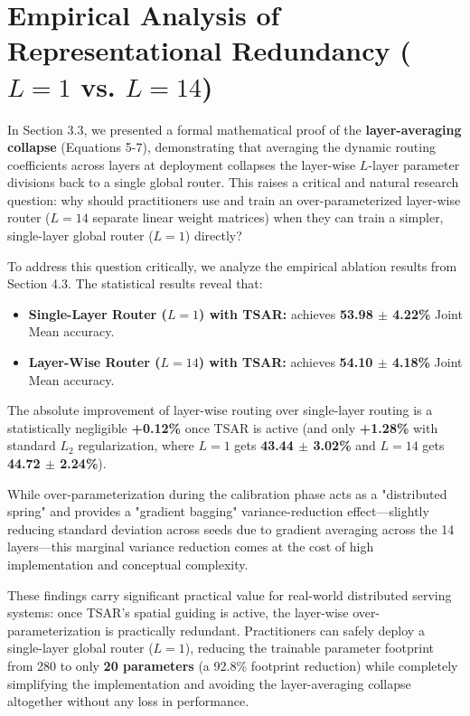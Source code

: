 \section{Empirical Analysis of Representational Redundancy ($L=1$ vs. $L=14$)}
\label{sec:redundancy_analysis}

In Section 3.3, we presented a formal mathematical proof of the \textbf{layer-averaging collapse}
(Equations 5-7), demonstrating that averaging the dynamic routing coefficients across layers at
deployment collapses the layer-wise $L$-layer parameter divisions back to a single global router.
This raises a critical and natural research question: why should practitioners use and train an
over-parameterized layer-wise router ($L=14$ separate linear weight matrices) when they can train a
simpler, single-layer global router ($L=1$) directly?

To address this question critically, we analyze the empirical ablation results from Section 4.3.
The statistical results reveal that:
\begin{itemize}
    \item \textbf{Single-Layer Router ($L=1$) with TSAR:} achieves \textbf{53.98 $\pm$ 4.22\%}
Joint Mean accuracy.
    \item \textbf{Layer-Wise Router ($L=14$) with TSAR:} achieves \textbf{54.10 $\pm$ 4.18\%} Joint
Mean accuracy.
\end{itemize}

The absolute improvement of layer-wise routing over single-layer routing is a statistically
negligible \textbf{+0.12\%} once TSAR is active (and only \textbf{+1.28\%} with standard $L_2$
regularization, where $L=1$ gets \textbf{43.44 $\pm$ 3.02\%} and $L=14$ gets \textbf{44.72 $\pm$
2.24\%}). 

While over-parameterization during the calibration phase acts as a "distributed spring" and
provides a "gradient bagging" variance-reduction effect—slightly reducing standard deviation across
seeds due to gradient averaging across the 14 layers—this marginal variance reduction comes at the
cost of high implementation and conceptual complexity. 

These findings carry significant practical value for real-world distributed serving systems: once
TSAR's spatial guiding is active, the layer-wise over-parameterization is practically redundant.
Practitioners can safely deploy a single-layer global router ($L=1$), reducing the trainable
parameter footprint from 280 to only \textbf{20 parameters} (a 92.8\% footprint reduction) while
completely simplifying the implementation and avoiding the layer-averaging collapse altogether
without any loss in performance.

